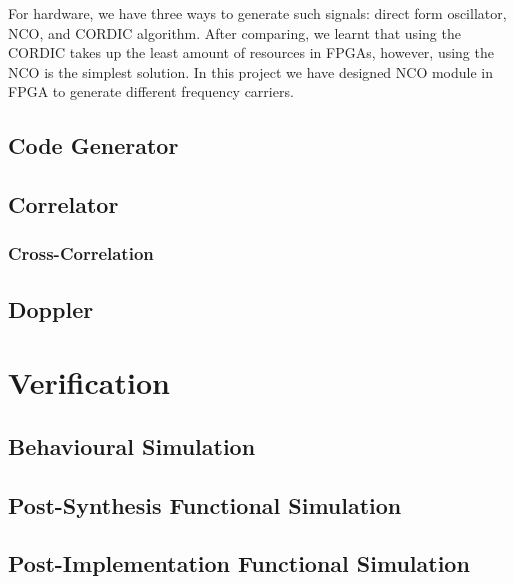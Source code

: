 For hardware, we have three ways to generate such signals: direct form oscillator, NCO, and CORDIC algorithm. After comparing, we learnt that using the CORDIC takes up the least amount of resources in FPGAs\cite{RN181}, however, using the NCO is the simplest solution. In this project we have designed NCO module in FPGA to generate different frequency carriers.

\subsection{Code Generator}



\subsection{Correlator}
\subsubsection{Cross-Correlation}

\subsection{Doppler}

\section{Verification}
\subsection{Behavioural Simulation}
\subsection{Post-Synthesis Functional Simulation}
\subsection{Post-Implementation Functional Simulation}

